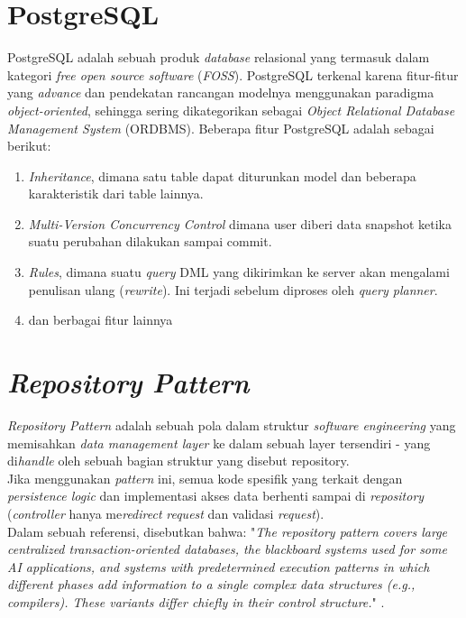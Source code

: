 	\section{  PostgreSQL}
	PostgreSQL adalah sebuah produk \textit{database} relasional yang termasuk dalam kategori \textit{free open source software} (\textit{FOSS}). 
	PostgreSQL terkenal karena fitur-fitur yang \textit{advance} dan pendekatan rancangan modelnya menggunakan paradigma \textit{object-oriented}, sehingga sering dikategorikan sebagai \textit{Object Relational Database Management System} (ORDBMS).
	Beberapa fitur PostgreSQL adalah sebagai berikut:
	\begin{enumerate}
	   	\item \textit{Inheritance}, dimana satu table dapat diturunkan model dan beberapa karakteristik dari table lainnya.
	   	\item \textit{Multi-Version Concurrency Control} dimana user diberi data snapshot ketika suatu perubahan dilakukan sampai commit.
	   	\item \textit{Rules}, dimana suatu \textit{query} DML yang dikirimkan ke server akan mengalami penulisan ulang (\textit{rewrite}). Ini terjadi sebelum diproses oleh \textit{query planner}.
	   	\item dan berbagai fitur lainnya \cite{noauthor_postgresql_nodate}
	\end{enumerate}
		
	\section{  \textit{Repository Pattern}}
	\textit{Repository Pattern} adalah sebuah pola dalam struktur \textit{software engineering} yang memisahkan \textit{data management layer} ke dalam sebuah layer tersendiri - yang di\textit{handle} oleh sebuah bagian struktur yang disebut repository. 
	\\ \indent
	Jika menggunakan \textit{pattern} ini, semua kode spesifik yang terkait dengan \textit{persistence logic} dan implementasi akses data berhenti sampai di \textit{repository} (\textit{controller} hanya me\textit{redirect} \textit{request} dan validasi \textit{request})\cite{noauthor_repository_2016}.
	\\ \indent
	Dalam sebuah referensi, disebutkan bahwa: "\textit{The repository pattern covers large centralized transaction-oriented databases, the blackboard systems used for some AI applications, and systems with predetermined execution patterns in which different phases add information to a single complex data structures (e.g., compilers). These variants differ chiefly in their control structure.}" \cite{shaw_patterns_1996}.
	
